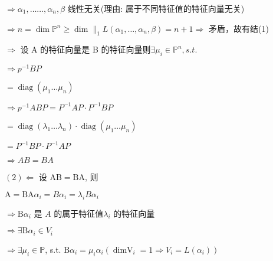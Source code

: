 \documentclass{article}
\begin{document}
$\Rightarrow \alpha_{1}, \ldots \ldots, \alpha_{n}, \beta$ 线性无关(理由: 属于不同特征值的特征向量无关)

$\Rightarrow n=\operatorname{dim} \mathbb{P}^{n} \geq \operatorname{dim} \|_{1}L\left(\alpha_{1}, \ldots, \alpha_{n}, \beta\right)=n+1 \Rightarrow$ 矛盾，故有结(1)

$\Rightarrow$ 设 $\mathrm{A}$ 的特征向量是 B 的特征向量则$\exists \mu_{i} \in \mathbb{P}^{n}, s.t .$

$\Rightarrow p^{-1} B P$

$=\operatorname{diag}\left(\mu_{1} \ldots \mu_{n}\right)$

$\Rightarrow p^{-1} A B P=P^{-1} A P \cdot P^{-1} B P$

$=\operatorname{diag}\left(\lambda_{1} \ldots \lambda_{n}\right) \cdot \operatorname{diag}\left(\mu_{1} \ldots \mu_{n}\right)$

$= P^{-1} B P \cdot P^{-1} A P$

$\Rightarrow A B=B A$

$(2) \Leftarrow$ 设 $\mathrm{AB}=\mathrm{BA}$, 则

$\mathrm{A}=\mathrm{BA} \alpha_{i}=B \alpha_{i}=\lambda_{i} B \alpha_{i}$

$\Rightarrow \mathrm{B} \alpha_{i}$ 是 $A$ 的属于特征值$\lambda_{i}$ 的特征向量

$\Rightarrow \exists \mathrm{B} \alpha_{i} \in V_{i}$

$\Rightarrow \exists \mu_{i} \in \mathbb{P}$, s.t. $\mathrm{B} \alpha_{i}=\mu_{i} \alpha_{i}\left(\operatorname{dimV}_{i}=1 \Rightarrow V_{i}=L\left(\alpha_{i}\right)\right)$
\end{document}
